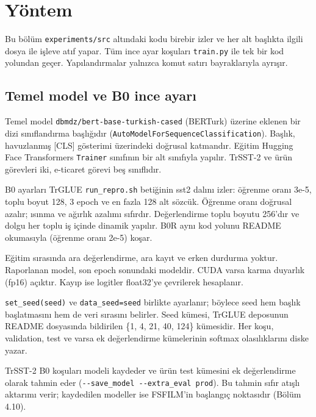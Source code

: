 \documentclass[11pt]{article}
\begin{document}
\section{Yöntem}\label{sec:4}

Bu bölüm \texttt{experiments/\allowbreak{}\allowbreak{}src} altındaki kodu birebir izler ve her alt başlıkta ilgili dosya ile işleve atıf yapar. Tüm ince ayar koşuları \texttt{train.\allowbreak{}\allowbreak{}py} ile tek bir kod yolundan geçer. Yapılandırmalar yalnızca komut satırı bayraklarıyla ayrışır.

\subsection{Temel model ve B0 ince ayarı}

Temel model \texttt{dbmdz/\allowbreak{}\allowbreak{}bert-{}\allowbreak{}base-{}\allowbreak{}turkish-{}\allowbreak{}cased} (BERTurk) \citep{schweter2020} üzerine eklenen bir dizi sınıflandırma başlığıdır (\texttt{AutoModelForSequenceClassification}). Başlık, havuzlanmış [CLS] gösterimi üzerindeki doğrusal katmandır. Eğitim Hugging Face Transformers \citep{wolf2020} \texttt{Trainer} sınıfının bir alt sınıfıyla yapılır. TrSST-2 ve ürün görevleri iki, e-ticaret görevi beş sınıflıdır.

B0 ayarları TrGLUE \texttt{run\_\allowbreak{}\allowbreak{}repro.\allowbreak{}\allowbreak{}sh} betiğinin sst2 dalını izler: öğrenme oranı 3e-5, toplu boyut 128, 3 epoch ve en fazla 128 alt sözcük. Öğrenme oranı doğrusal azalır; ısınma ve ağırlık azalımı sıfırdır. Değerlendirme toplu boyutu 256'dır ve dolgu her toplu iş içinde dinamik yapılır. B0R aynı kod yolunu README okumasıyla (öğrenme oranı 2e-5) koşar.

Eğitim sırasında ara değerlendirme, ara kayıt ve erken durdurma yoktur. Raporlanan model, son epoch sonundaki modeldir. CUDA varsa karma duyarlık (fp16) açıktır. Kayıp ise logitler float32'ye çevrilerek hesaplanır.

\texttt{set\_\allowbreak{}\allowbreak{}seed(seed)} ve \texttt{data\_\allowbreak{}\allowbreak{}seed=seed} birlikte ayarlanır; böylece seed hem başlık başlatmasını hem de veri sırasını belirler. Seed kümesi, TrGLUE deposunun README dosyasında bildirilen \{1, 4, 21, 40, 124\} kümesidir. Her koşu, validation, test ve varsa ek değerlendirme kümelerinin softmax olasılıklarını diske yazar.

TrSST-2 B0 koşuları modeli kaydeder ve ürün test kümesini ek değerlendirme olarak tahmin eder (\texttt{-{}\allowbreak{}-{}\allowbreak{}save\_\allowbreak{}\allowbreak{}model -{}\allowbreak{}-{}\allowbreak{}extra\_\allowbreak{}\allowbreak{}eval prod}). Bu tahmin sıfır atışlı aktarımı verir; kaydedilen modeller ise FSFILM'in başlangıç noktasıdır (Bölüm 4.10).
\end{document}
